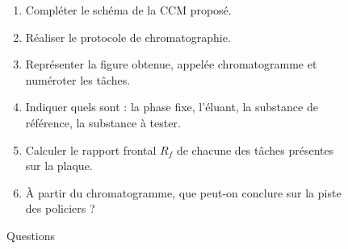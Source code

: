\documentclass[a4paper,11pt,fleqn]{article}%
\begin{document}
\makeatletter
\setlength{\@fptop}{0pt}
\makeatother
\begin{figure}[t!]
    \caption*{Questions}
    \begin{enumerate}
        \item Compléter le schéma de la CCM proposé.
        \item Réaliser le protocole de chromatographie.
        \item Représenter la figure obtenue, appelée chromatogramme et numéroter les tâches.
        \item Indiquer quels sont : la phase fixe, l'éluant, la substance de référence, la substance à tester.
        \item Calculer le rapport frontal $R_f$ de chacune des tâches présentes sur la plaque.
        \item À partir du chromatogramme, que peut-on conclure sur la piste des policiers ?
    \end{enumerate}
\end{figure}
\end{document}
